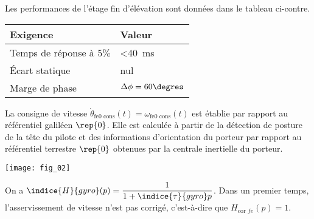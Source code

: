 Les performances de l’étage fin d’élévation sont données dans le tableau ci-contre. 
\begin{margintable}
\begin{tabular}{p{3cm}l}
\hline
\textbf{Exigence} & Valeur \\ \hline
Temps de réponse à 5\% & <\SI{40}{ms} \\ 
Écart statique & nul \\ 
Marge de phase & $\Delta \phi = 60\degres$ \\ \hline
\end{tabular}
\end{margintable}

La consigne de vitesse $\dot{\theta}_{\text{fe0 cons}}(t)= \omega_{\text{fe0 cons}}(t)$ est établie par rapport au référentiel galiléen $\rep{0}$. Elle est calculée à partir de la détection de posture  de la tête du pilote et des informations 
d’orientation du porteur par rapport au référentiel terrestre $\rep{0}$ obtenues par la centrale inertielle du porteur.


\begin{center}
\texttt{[image: fig\_02]}

\end{center}

On a $\indice{H}{gyro}(p)=\dfrac{1}{1+\indice{\tau}{gyro}p}$.
Dans un premier temps, l’asservissement de vitesse n’est pas corrigé, c’est-à-dire que $H_{\text{cor }fe}(p)=1$.  



